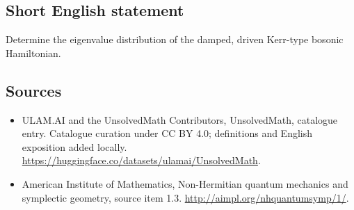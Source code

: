 \documentclass[11pt]{article}
\begin{document}
\subsection{Short English statement}
Determine the eigenvalue distribution of the damped, driven Kerr-type bosonic Hamiltonian.
\subsection{Sources}
\begin{itemize}
\item[\hypertarget{source:statement:1}{S1}] ULAM.AI and the UnsolvedMath Contributors, UnsolvedMath, catalogue entry. Catalogue curation under CC BY 4.0; definitions and English exposition added locally.
\url{https://huggingface.co/datasets/ulamai/UnsolvedMath}.
\item[\hypertarget{source:statement:2}{S2}] American Institute of Mathematics, Non-Hermitian quantum mechanics and symplectic geometry, source item 1.3.
\url{http://aimpl.org/nhquantumsymp/1/}.
\end{itemize}
\label{end:statement}
\end{document}
